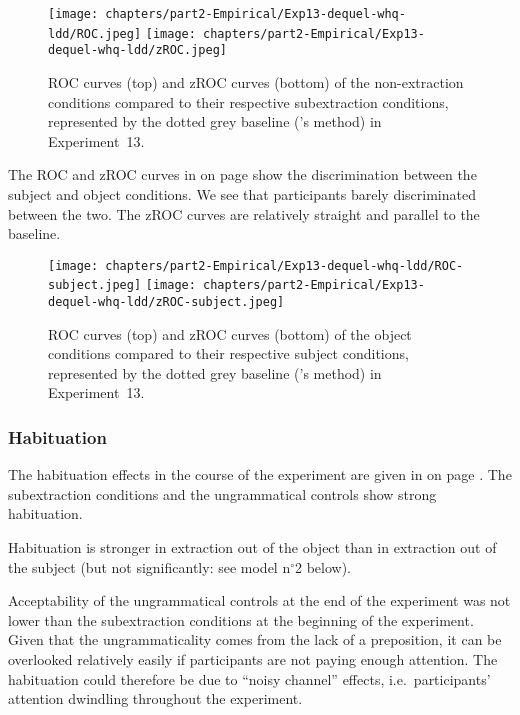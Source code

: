 \begin{figure}
    \centering
    \texttt{[image: chapters/part2-Empirical/Exp13-dequel-whq-ldd/ROC.jpeg]}
    \texttt{[image: chapters/part2-Empirical/Exp13-dequel-whq-ldd/zROC.jpeg]}
    \caption{ROC curves (top) and zROC curves (bottom) of the non-extraction conditions compared to their respective subextraction conditions, represented by the dotted grey baseline (\citealt{Dillon.2019}'s method) in Experiment~13.}
    \label{fig:exp13-ROC}
\end{figure}

The ROC and zROC curves in  on page \pageref{fig:exp13-ROC-subj} show the discrimination between the subject and object conditions. We see that participants barely discriminated between the two. The zROC curves are relatively straight and parallel to the baseline.

\begin{figure}
    \centering
    \texttt{[image: chapters/part2-Empirical/Exp13-dequel-whq-ldd/ROC-subject.jpeg]}
    \texttt{[image: chapters/part2-Empirical/Exp13-dequel-whq-ldd/zROC-subject.jpeg]}
    \caption{ROC curves (top) and zROC curves (bottom) of the object conditions compared to their respective subject conditions, represented by the dotted grey baseline (\citealt{Dillon.2019}'s method) in Experiment~13.}
    \label{fig:exp13-ROC-subj}
\end{figure}

\subsubsection{Habituation}\largerpage

The habituation effects in the course of the experiment are given in  on page \pageref{fig:exp13-habituation}. The subextraction conditions and the ungrammatical controls show strong habituation. 

Habituation is stronger in extraction out of the object than in extraction out of the subject (but not significantly: see model n$^{\circ}$2 below).

Acceptability of the ungrammatical controls at the end of the experiment was not lower than the subextraction conditions at the beginning of the experiment. Given that the ungrammaticality comes from the lack of a preposition, it can be overlooked relatively easily if participants are not paying enough attention. The habituation could therefore be due to ``noisy channel'' effects, i.e.\ participants' attention dwindling throughout the experiment.


